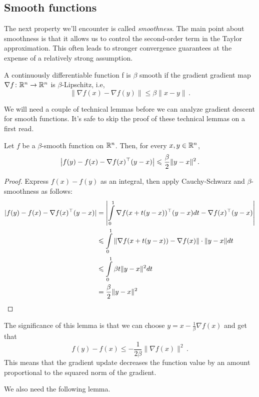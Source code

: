 \subsection{Smooth functions}

The next property we'll encounter is called \emph{smoothness}.  The main point
about smoothness is that it allows us to control the second-order term in the
Taylor approximation. This often leads to stronger convergence guarantees at the
expense of a relatively strong assumption.

\begin{definition}[Smoothness]
A continuously differentiable function f is $\beta$ smooth if the gradient
gradient map $\nabla f\colon\mathbb{R}^n\to\mathbb{R}^n$ is $\beta$-Lipschitz, i.e,
\[
\|\nabla f(x) - \nabla f(y)\| \leq \beta\|x-y\|\,.
\]
\end{definition}

We will need a couple of technical lemmas before we can analyze gradient descent
for smooth functions. It's safe to skip the proof of these technical lemmas on a
first read.

\begin{lemma}
Let $f$ be a $\beta$-smooth function on $\mathbb{R}^n$.  Then, for every $x,y \in \mathbb{R}^n$, 
\[
\left|f(y) - f(x) - \nabla f(x)^\top(y-x)\right| \leqslant \frac{\beta}{2}\|y-x\|^2\,.
\]
\end{lemma}

\begin{proof}
Express $f(x) - f(y)$ as an integral, then apply Cauchy-Schwarz and 
$\beta$-smoothness as follows:
\begin{align*}
|f(y) - f(x) - \nabla f(x)^\top(y-x)|
&=\left|\int\limits_{0}^1 \nabla f(x + t(y-x))^\top(y-x)dt - \nabla
f(x)^\top(y-x)\right|\\
&\leqslant  \int\limits_{0}^1 \|\nabla f(x + t(y-x)) - \nabla f(x)\|\cdot \|y-x\|dt\\
&\leqslant \int\limits_{0}^1 \beta t\|y-x\|^2dt\\
&= \frac{\beta}{2}\|y-x\|^2\qedhere
\end{align*}
\end{proof}
The significance of this lemma is that we can choose $y=x-\frac1\beta\nabla f(x)$ and
get that 
\[
f(y)-f(x)\le -\frac{1}{2\beta}\|\nabla f(x)\|^2\,.
\]
This means that the gradient update decreases the function value by an amount
proportional to the squared norm of the gradient.

We also need the following lemma.

